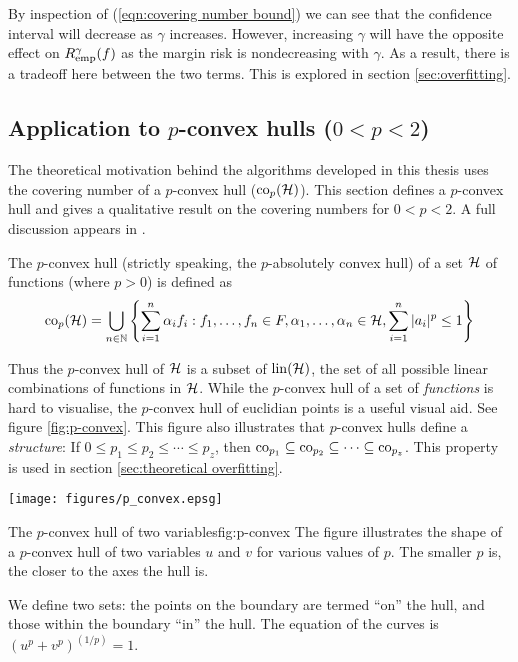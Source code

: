 By inspection of (\ref{eqn:covering number bound}) we can see that the
confidence interval will decrease as $\gamma$ increases.  However,
increasing $\gamma$ will have the opposite effect on
$R_{\mathrm{emp}}^{\gamma}(f)$ as the margin risk is nondecreasing with
$\gamma$.  As a result, there is a tradeoff here between the two
terms.  This is explored in section \ref{sec:overfitting}.


\subsection{Application to $p$-convex hulls ($0 < p < 2$)}
\label{sec:p-convex}

The theoretical motivation behind the algorithms developed in this
thesis uses the covering number of a $p$-convex hull ($\mathrm{co}_p(\mathcal{H})$).
This section defines a $p$-convex hull and gives a qualitative result
on the covering numbers for $0 < p < 2$.  A full discussion appears in
\cite{Williamson99}.

\begin{definition}
The $p$-convex hull (strictly speaking, the $p$-absolutely convex hull) of
a set $\mathcal{H}$ of functions (where $p>0$) is defined as
%
\begin{equation}
\mathrm{co}_p (\mathcal{H}) =
 \bigcup _{n \in \mathbb{N}}
\left\{
 \sum_{i=1}^{n}
 \alpha _i
f_i : f_1, \ldots, f_n \in F,
 \alpha _1, \ldots, \alpha _n \in \mathbb{\mathcal{H}},
 \sum_{i=1}^{n} | a_i |^p \leq 1
\right\}
\end{equation}
\end{definition}

Thus the $p$-convex hull of $\mathcal{H}$ is a subset of $\mathrm{lin}(\mathcal{H})$, the
set of all possible linear combinations of functions in $\mathcal{H}$.
While the $p$-convex hull of a set of \emph{functions} is hard to
visualise, the $p$-convex hull of euclidian points is a useful visual
aid.  See figure \ref{fig:p-convex}.  This figure also illustrates
that $p$-convex hulls define a \emph{structure}:  If $0 \leq p_1 \leq p_2
\leq \cdots \leq p_z$, then $\mathrm{co}_{p_1} \subseteq \mathrm{co}_{p_2} \subseteq \cdots
\subseteq \mathrm{co}_{p_z}$.  This property is used in section
\ref{sec:theoretical overfitting}.

\begin{linefigure}
\begin{center}
\texttt{[image: figures/p\_convex.epsg]}
\end{center}
\begin{capt}{The $p$-convex hull of two variables}{fig:p-convex}
The figure illustrates the shape of a $p$-convex hull of two variables $u$
and $v$ for various values of $p$.  The smaller $p$ is, the closer to
the axes the hull is.  

We define two sets: the points on the boundary are termed ``on'' the
hull, and those within the boundary ``in'' the hull.  The equation of
the curves is $\left( u^p + v^p \right) ^{(1/p)} = 1$.
\end{capt}
\end{linefigure}

